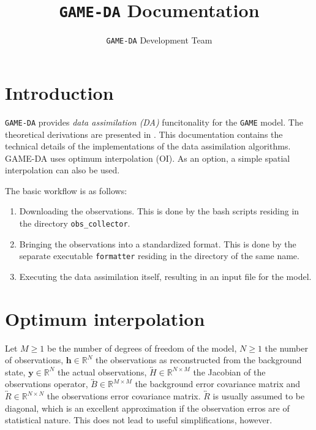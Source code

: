 \documentclass{report}
\title{\texttt{GAME-DA} Documentation}
\author{\texttt{GAME-DA} Development Team}
\date{}
\begin{document}
\maketitle

\tableofcontents

\chapter{Introduction}
\label{sec:introduction}

\texttt{GAME-DA} provides \textit{data assimilation (DA)} funcitonality for the \texttt{GAME} model. The theoretical derivations are presented in \cite{kompendium}. This documentation contains the technical details of the implementations of the data assimilation algorithms. GAME-DA uses optimum interpolation (OI). As an option, a simple spatial interpolation can also be used.

The basic workflow is as follows:
%
\begin{enumerate}
\item Downloading the observations. This is done by the bash scripts residing in the directory \texttt{obs\_collector}.
\item Bringing the observations into a standardized format. This is done by the separate executable \texttt{formatter} residing in the directory of the same name.
\item Executing the data assimilation itself, resulting in an input file for the model.
\end{enumerate}

\chapter{Optimum interpolation}
\label{chap:optimum_interpolation}

Let $M \geq 1$ be the number of degrees of freedom of the model, $N \geq 1$ the number of observations, $\mathbf{h} \in \mathbb{R}^N$ the observations as reconstructed from the background state, $\mathbf{y} \in \mathbb{R}^N$ the actual observations, $\overleftrightarrow{H} \in \mathbb{R}^{N\times M}$ the Jacobian of the observations operator, $\overleftrightarrow{B} \in \mathbb{R}^{M\times M}$ the background error covariance matrix and $\overleftrightarrow{R} \in \mathbb{R}^{N\times N}$ the observations error covariance matrix. $\overleftrightarrow{R}$ is usually assumed to be diagonal, which is an excellent approximation if the observation erros are of statistical nature. This does not lead to useful simplifications, however.
\end{document}
